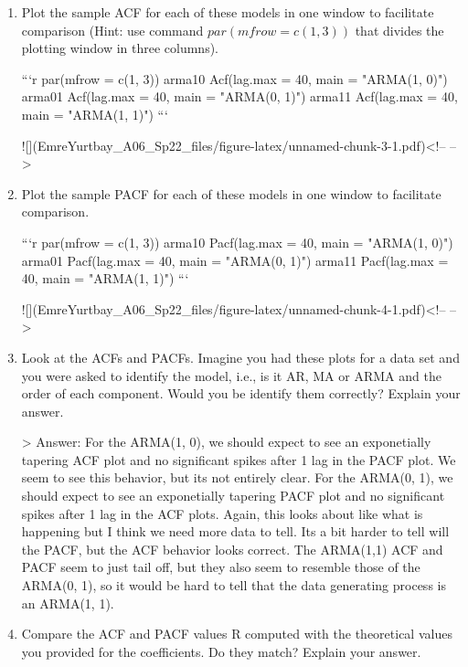 \documentclass[
]{article}
\begin{document}
\begin{enumerate}[label=(\alph*)]

\item Plot the sample ACF for each of these models in one window to facilitate comparison (Hint: use command $par(mfrow=c(1,3))$ that divides the plotting window in three columns).  


```r
par(mfrow = c(1, 3))
arma10 %
  Acf(lag.max = 40,
      main = "ARMA(1, 0)")
arma01 %
  Acf(lag.max = 40,
      main = "ARMA(0, 1)")
arma11 %
  Acf(lag.max = 40,
      main = "ARMA(1, 1)")
```

![](EmreYurtbay_A06_Sp22_files/figure-latex/unnamed-chunk-3-1.pdf)<!-- --> 


\item Plot the sample PACF for each of these models in one window to facilitate comparison.  


```r
par(mfrow = c(1, 3))
arma10 %
  Pacf(lag.max = 40,
      main = "ARMA(1, 0)")
arma01 %
  Pacf(lag.max = 40,
      main = "ARMA(0, 1)")
arma11 %
  Pacf(lag.max = 40,
      main = "ARMA(1, 1)")
```

![](EmreYurtbay_A06_Sp22_files/figure-latex/unnamed-chunk-4-1.pdf)<!-- --> 

\item Look at the ACFs and PACFs. Imagine you had these plots for a data set and you were asked to identify the model, i.e., is it AR, MA or ARMA and the order of each component. Would you be identify them correctly? Explain your answer.

> Answer: For the ARMA(1, 0), we should expect to see an exponetially tapering 
ACF plot and no significant spikes after 1 lag in the PACF plot. We seem 
to see this behavior, but its not entirely clear. For the ARMA(0, 1), we should expect to see an exponetially tapering  
PACF plot and no significant spikes after 1 lag in the ACF plots. Again, this looks
about like what is happening but I think we need more data to tell. Its a bit 
harder to tell will the PACF, but the ACF behavior looks correct. The ARMA(1,1) 
ACF and PACF seem to just tail off, but they also
seem to resemble those of the ARMA(0, 1), so it would be hard 
to tell that the data generating process is an ARMA(1, 1). 

\item Compare the ACF and PACF values R computed with the theoretical values you provided for the coefficients. Do they match? Explain your answer.




\end{enumerate}
\end{document}
